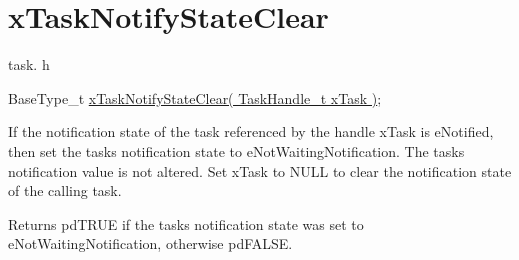 \hypertarget{group__xTaskNotifyStateClear}{}\section{x\+Task\+Notify\+State\+Clear}
\label{group__xTaskNotifyStateClear}
task. h 
\begin{DoxyPre}BaseType\_t \hyperlink{task_8h_a4cb6c908a9d2d733e9d519d7dc27bb34}{xTaskNotifyStateClear( TaskHandle\_t xTask )};\end{DoxyPre}


If the notification state of the task referenced by the handle x\+Task is e\+Notified, then set the task\textquotesingle{}s notification state to e\+Not\+Waiting\+Notification. The task\textquotesingle{}s notification value is not altered. Set x\+Task to N\+U\+LL to clear the notification state of the calling task.

\begin{DoxyReturn}{Returns}
pd\+T\+R\+UE if the task\textquotesingle{}s notification state was set to e\+Not\+Waiting\+Notification, otherwise pd\+F\+A\+L\+SE. 
\end{DoxyReturn}
